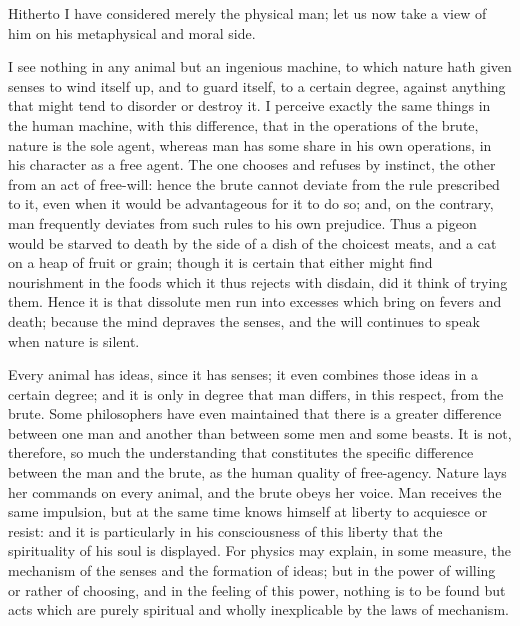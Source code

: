 \documentclass[12pt]{report}
\begin{document}
Hitherto I have considered merely the physical man; let us now take a view of him on his metaphysical and moral side.

I see nothing in any animal but an ingenious machine, to which nature hath given senses to wind itself up, and to guard itself, to a certain degree, against anything that might tend to disorder or destroy it. I perceive exactly the same things in the human machine, with this difference, that in the operations of the brute, nature is the sole agent, whereas man has some share in his own operations, in his character as a free agent. The one chooses and refuses by instinct, the other from an act of free-will: hence the brute cannot deviate from the rule prescribed to it, even when it would be advantageous for it to do so; and, on the contrary, man frequently deviates from such rules to his own prejudice. Thus a pigeon would be starved to death by the side of a dish of the choicest meats, and a cat on a heap of fruit or grain; though it is certain that either might find nourishment in the foods which it thus rejects with disdain, did it think of trying them. Hence it is that dissolute men run into excesses which bring on fevers and death; because the mind depraves the senses, and the will continues to speak when nature is silent.

Every animal has ideas, since it has senses; it even combines those ideas in a certain degree; and it is only in degree that man differs, in this respect, from the brute. Some philosophers have even maintained that there is a greater difference between one man and another than between some men and some beasts. It is not, therefore, so much the understanding that constitutes the specific difference between the man and the brute, as the human quality of free-agency. Nature lays her commands on every animal, and the brute obeys her voice. Man receives the same impulsion, but at the same time knows himself at liberty to acquiesce or resist: and it is particularly in his consciousness of this liberty that the spirituality of his soul is displayed. For physics may explain, in some measure, the mechanism of the senses and the formation of ideas; but in the power of willing or rather of choosing, and in the feeling of this power, nothing is to be found but acts which are purely spiritual and wholly inexplicable by the laws of mechanism.
\end{document}
